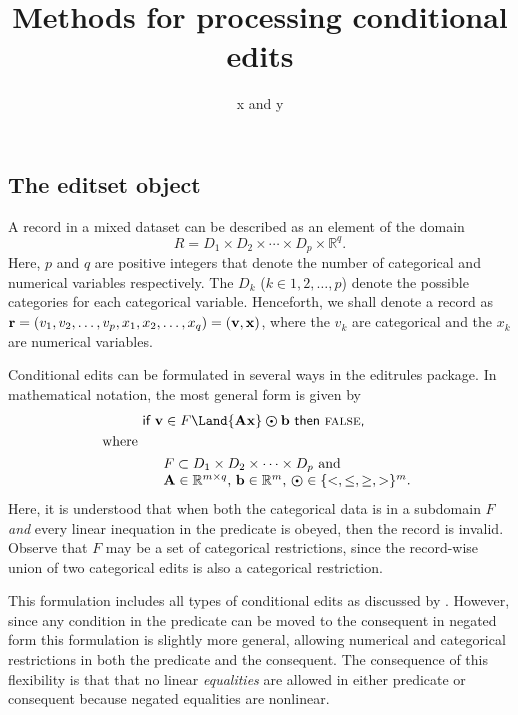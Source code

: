 \documentclass[11pt,fleqn,a4paper]{article}
\title{Methods for processing conditional edits}
\author{x and y}
\begin{document}
\maketitle

\subsection{The {\sf editset} object}
\label{ss:editset}
A record in a mixed dataset can be described as an element of the domain
\begin{equation}
\label{eq:domain}
R = D_1\times D_2\times\cdots\times D_p\times \mathbb{R}^{q}.
\end{equation}
Here, $p$ and $q$ are positive integers that denote the number of categorical
and numerical variables respectively. The $D_k$ ($k\in1,2,\ldots,p$) denote the
possible categories for each categorical variable. Henceforth, we shall denote a
record as ${\bf r}=(v_1,v_2,\ldots,v_p,x_1,x_2,\ldots,x_q)=({\bf v},{\bf x})$, where
the $v_k$ are categorical and the $x_k$ are numerical variables.

Conditional edits can be formulated in several ways in the editrules package.
In mathematical notation, the most general form is given by
\begin{eqnarray}
\label{eqedit1}
\lefteqn{
\textrm{\sf if } {\bf v}\in F \Land {\bf Ax}\boldsymbol{\odot}{\bf b} \textrm{ \sf then {\sc false},}}\\
\textrm{where }\\
&&\begin{array}{l}
    F \subset D_1 \times D_2 \times\cdots\times D_p \textrm{ and}\\
{\bf A} \in \mathbb{R}^{m\times q} \textrm{, }  
    {\bf b} \in \mathbb{R}^{m}\textrm{, }   
    \boldsymbol{\odot}\in\{<,\leq,\geq, >\}^m. \nonumber
\end{array}
\end{eqnarray}
Here, it is understood that when both the categorical data is in a subdomain
$F$ {\em and} every linear inequation in the predicate is obeyed, then the record
is invalid. Observe that $F$ may be a set of categorical restrictions, since the
record-wise union of two categorical edits is also a categorical restriction. 

This formulation includes all types of conditional edits as discussed by
\cite{waal:2003}. However, since any condition in the predicate can be moved to
the consequent in negated form this formulation is slightly more general,
allowing numerical and categorical restrictions in both the predicate and the
consequent. The consequence of this flexibility is that that no linear
{\em equalities} are allowed in either predicate or consequent because negated
equalities are nonlinear.
\end{document}
